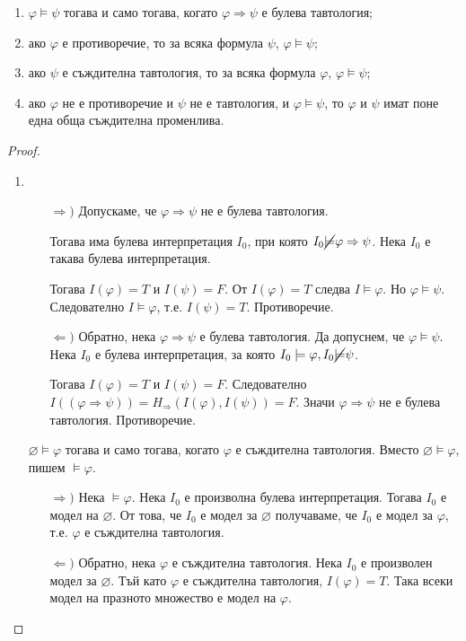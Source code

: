\documentclass{article}
\def\Proofs{1}
\begin{document}
\begin{prop}
$\ $
\begin{enumerate}
\item $\varphi \models \psi$ тогава и само тогава, когато $\varphi \Rightarrow \psi$ е булева тавтология;
\item ако $\varphi$ е противоречие, то за всяка формула $\psi$, $\varphi \models \psi$;
\item ако $\psi$ е съждителна тавтология, то за всяка формула $\varphi$, $\varphi \models \psi$;
\item ако $\varphi$ не е противоречие и $\psi$ не е тавтология, и $\varphi \models \psi$, то $\varphi$ и $\psi$ имат поне една обща съждителна променлива.
\end{enumerate}


\ifcase\Proofs\or
\begin{proof}
$\ $
\begin{enumerate}
\item
\begin{itemize}
\item[$\Rightarrow)$] Допускаме, че $\varphi \Rightarrow \psi$ не е булева тавтология. 

Тогава има булева интерпретация $I_0$, при която $I_0 \cancel{\models} \varphi \Rightarrow \psi$. Нека $I_0$ е такава булева интерпретация.

Тогава $I(\varphi) = T$ и $I(\psi) = F$. От $I(\varphi) = T$ следва $I \models \varphi$. Но $\varphi \models \psi$. Следователно $I \models \varphi$, т.е. $I(\psi) = T$. Противоречие.
\item[$\Leftarrow)$] Обратно, нека $\varphi \Rightarrow \psi$ е булева тавтология. Да допуснем, че $\varphi \models \psi$. Нека $I_0$ е булева интерпретация, за която $I_0 \models \varphi, I_0 \cancel{\models} \psi$.

Тогава $I(\varphi) = T$ и $I(\psi) = F$. Следователно $I((\varphi \Rightarrow \psi)) = H_\Rightarrow(I(\varphi), I(\psi)) = F$. Значи $\varphi \Rightarrow \psi$ не е булева тавтология. Противоречие.
\end{itemize}
\begin{remark}
$\varnothing \models \varphi$ тогава и само тогава, когато $\varphi$ е съждителна тавтология. Вместо $\varnothing \models \varphi$, пишем $\models \varphi$. 
\end{remark}
\begin{itemize}
\item[$\Rightarrow)$] Нека $\models \varphi$. Нека $I_0$ е произволна булева интерпретация. Тогава $I_0$ е модел на $\varnothing$. От това, че $I_0$ е модел за $\varnothing$ получаваме, че $I_0$ е модел за $\varphi$, т.е. $\varphi$ е съждителна тавтология.
\item[$\Leftarrow)$] Обратно, нека $\varphi$ е съждителна тавтология. Нека $I_0$ е произволен модел за $\varnothing$. Тъй като $\varphi$ е съждителна тавтология, $I(\varphi) = T$. Така всеки модел на празното множество е модел на $\varphi$.
\end{itemize}


\end{enumerate}
\end{proof}
\end{prop}
\end{document}
